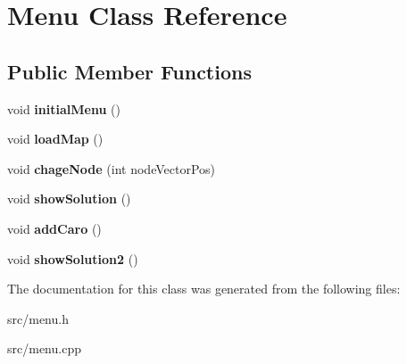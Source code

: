 \hypertarget{class_menu}{}\section{Menu Class Reference}
\label{class_menu}
\subsection*{Public Member Functions}
\begin{DoxyCompactItemize}
\item 
\mbox{\label{class_menu_a38e570f722a3508f621ae8993cd79c55}} 
void {\bfseries initial\+Menu} ()
\item 
\mbox{\label{class_menu_a546a51d89e485d6b8a0f29803e0d356a}} 
void {\bfseries load\+Map} ()
\item 
\mbox{\label{class_menu_acb6701f36a98300fc60a1287cddcb01b}} 
void {\bfseries chage\+Node} (int node\+Vector\+Pos)
\item 
\mbox{\label{class_menu_a4472b88dfa719a320c3073381ef621f8}} 
void {\bfseries show\+Solution} ()
\item 
\mbox{\label{class_menu_a5e4011c5964284d9962b1320ab832bab}} 
void {\bfseries add\+Caro} ()
\item 
\mbox{\label{class_menu_a73f0224810bcd915e955e29eedc81f7f}} 
void {\bfseries show\+Solution2} ()
\end{DoxyCompactItemize}


The documentation for this class was generated from the following files\+:\begin{DoxyCompactItemize}
\item 
src/menu.\+h\item 
src/menu.\+cpp\end{DoxyCompactItemize}
